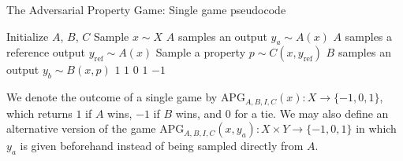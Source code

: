 \begin{algorithm}\label{alg:apg}
\caption{The Adversarial Property Game: Single game pseudocode}
\begin{algorithmic}[1]
\State Initialize $A$, $B$, $C$
\State Sample $x \sim X$
\State $A$ samples an output $y_a \sim A(x)$
\State $A$ samples a reference output $y_\mathrm{ref} \sim A(x)$
\State Sample a property $p \sim C(x, y_\mathrm{ref})$
\State $B$ samples an output $y_b \sim B(x, p)$
    \State \Return $1$ 
    \State \Return $1$ 
    \State \Return $0$ 
    \State \Return $1$ 
\Else
    \State \Return $-1$ 
\EndIf
\end{algorithmic}
\end{algorithm}

We denote the outcome of a single game by $\text{APG}_{A,B,I,C}(x): X \to \{-1, 0, 1\}$, which returns $1$ if $A$ wins, $-1$ if $B$ wins, and $0$ for a tie. We may also define an alternative version of the game $\text{APG}_{A,B,I,C}(x, y_a): X \times Y \to \{-1, 0, 1\}$ in which $y_a$ is given beforehand instead of being sampled directly from $A$.

